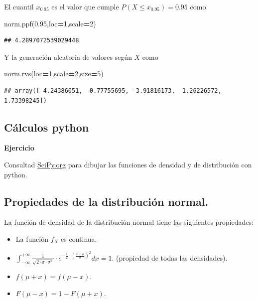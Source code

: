 \documentclass[]{book}
\newenvironment{Shaded}{\begin{snugshade}}{\end{snugshade}}
\newcommand{\DecValTok}[1]{\textcolor[rgb]{0.00,0.00,0.81}{#1}}
\newcommand{\FloatTok}[1]{\textcolor[rgb]{0.00,0.00,0.81}{#1}}
\newcommand{\NormalTok}[1]{#1}
\newcommand{\OperatorTok}[1]{\textcolor[rgb]{0.81,0.36,0.00}{\textbf{#1}}}
\providecommand{\tightlist}{%
  \setlength{\itemsep}{0pt}\setlength{\parskip}{0pt}}
\begin{document}
El cuantil \(x_{0.95}\) es el valor que cumple \(P(X\leq x_{0.95})=0.95\) como

\begin{Shaded}
\begin{Highlighting}[]
\NormalTok{norm.ppf(}\FloatTok{0.95}\NormalTok{,loc}\OperatorTok{=}\DecValTok{1}\NormalTok{,scale}\OperatorTok{=}\DecValTok{2}\NormalTok{)}
\end{Highlighting}
\end{Shaded}

\begin{verbatim}
## 4.2897072539029448
\end{verbatim}

Y la generación aleatoria de valores según \(X\) como

\begin{Shaded}
\begin{Highlighting}[]
\NormalTok{norm.rvs(loc}\OperatorTok{=}\DecValTok{1}\NormalTok{,scale}\OperatorTok{=}\DecValTok{2}\NormalTok{,size}\OperatorTok{=}\DecValTok{5}\NormalTok{)}
\end{Highlighting}
\end{Shaded}

\begin{verbatim}
## array([ 4.24386051,  0.77755695, -3.91816173,  1.26226572,  1.73398245])
\end{verbatim}

\hypertarget{cuxe1lculos-python}{%
\subsection{Cálculos python}\label{cuxe1lculos-python}}

\textbf{Ejercicio}

Consultad \href{https://docs.scipy.org/doc/scipy/reference/generated/scipy.stats.norm.html}{SciPy.org} para dibujar las funciones de densidad y de distribución con python.

\hypertarget{propiedades-de-la-distribuciuxf3n-normal.}{%
\subsection{Propiedades de la distribución normal.}\label{propiedades-de-la-distribuciuxf3n-normal.}}

La función de densidad de la
distribución normal tiene las siguientes propiedades:

\begin{itemize}
\tightlist
\item
  La función \(f_X\) es continua.
\item
  \(\int_{-\infty}^{+\infty} \frac{1}{\sqrt{2\cdot\pi\cdot \sigma^2}}\cdot e^{-\frac{1}{2}\cdot \left(\frac{x-\mu}{\sigma}\right)^2} dx =1.\) (propiedad de todas las densidades).
\item
  \(f(\mu+x)=f(\mu-x)\).
\item
  \(F(\mu-x)=1-F(\mu+x)\).
\end{itemize}
\end{document}
